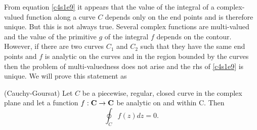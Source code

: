 From equation \eqref{c4s1e9} it appears that the value of the integral of a
complex-valued function along a curve $C$ depends only on the end points and
is therefore unique. But this is not always true. Several complex functions 
are multi-valued and the value of the primitive $g$ of the integral $f$ 
depends on the contour. However, if there are two curves $C_1$ and $C_2$ such
that they have the same end points and $f$ is analytic on the curves and in the
region bounded by the curves then the problem of multi-valuedness does not 
arise and the rhs of \eqref{c4s1e9} is unique. We will prove this statement as
\begin{thm}(Cauchy-Goursat)\label{c4s1t2}
Let $C$ be a piecewise, regular, closed curve in the complex plane and let a
function $f:\mathbf{C} \rightarrow \mathbf{C}$ be analytic on and within C. Then
\[
\oint_C f(z)dz = 0.
\]
\end{thm}
